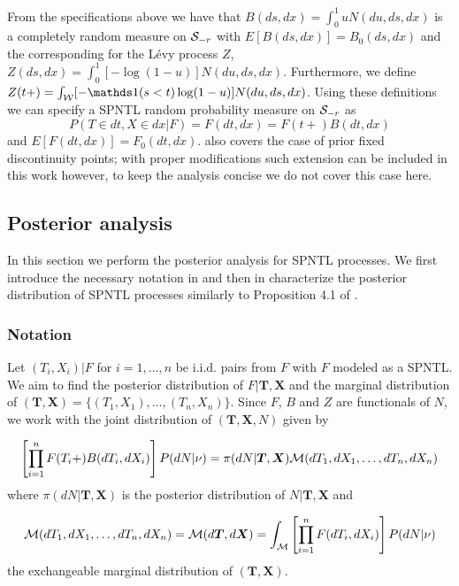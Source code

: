 From the specifications above we have that $B(ds, dx) = \int_0^1 uN(du,ds,dx)$ is a completely random measure on $\mathcal{S}_{-r}$ with $E\left[B(ds, dx)\right] = B_0(ds,dx)$ and the corresponding for the L{\'e}vy process $Z$, $Z(ds, dx) = \int_0^1 [-\log(1-u)]N(du,ds,dx)$. Furthermore, we define $Z(t+) = \int_{\calW}[-\indicator(s < t)\log(1-u)]N(du,ds,dx)$. Using these definitions we can specify a SPNTL random probability measure on $\mathcal{S}_{-r}$ as 
\begin{equation*}
P(T \in dt, X \in dx | F) = F(dt, dx) = F(t+)B(dt, dx)  
\end{equation*}
and $E\left[F(dt, dx)\right] = F_0(dt, dx)$. \cite{james2006poisson} also covers the case of prior fixed discontinuity points; with proper modifications such extension can be included in this work however, to keep the analysis concise we do not cover this case here.

\subsection{Posterior analysis}\label{SPNTL_posterior}
In this section we perform the posterior analysis for SPNTL processes. We first introduce the necessary notation in  and then in  characterize the posterior distribution of SPNTL processes similarly to Proposition 4.1 of \cite{james2006poisson}.

\subsubsection{Notation}\label{notation}
Let $(T_i, X_i)|F$ for $i=1, \ldots, n$ be i.i.d. pairs from $F$ with $F$ modeled as a SPNTL. We aim to find the posterior distribution of $F|\boldsymbol{T}, \boldsymbol{X}$ and the marginal distribution of $(\boldsymbol{T}, \boldsymbol{X}) = \{(T_1, X_1), \ldots, (T_n, X_n)\}$. Since $F$, $B$ and $Z$ are functionals of $N$, we work with the joint distribution of $(\boldsymbol{T}, \boldsymbol{X}, N)$ given by

\begin{equation}\label{joint_dist}
\left[\prod_{i=1}^n F(T_i +) B(dT_i, dX_i)\right]P(dN|\nu) = \pi(dN|\boldsymbol{T}, \boldsymbol{X}) \mathcal{M}(dT_1, dX_1, \ldots, dT_n, dX_n)
\end{equation}
where $\pi(dN|\boldsymbol{T}, \boldsymbol{X})$ is the posterior distribution of $N|\boldsymbol{T}, \boldsymbol{X}$ and 

\begin{equation*}
\mathcal{M}(dT_1, dX_1, \ldots, dT_n, dX_n) = \mathcal{M}(d\boldsymbol{T}, d\boldsymbol{X}) = \int_{\mathcal{M}}\left[\prod_{i=1}^n F(dT_i, dX_i)\right]P(dN|\nu)
\end{equation*}
the exchangeable marginal distribution of $(\boldsymbol{T}, \boldsymbol{X})$.

